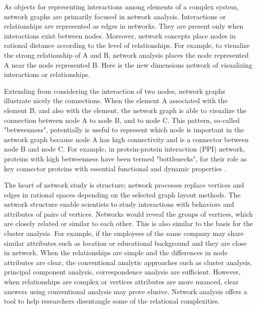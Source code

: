 As objects for representing interactions among elements of a complex system, network graphs are primarily focused in network analysis. Interactions or relationships are represented as edges in networks. They are present only when interactions exist between nodes. Moreover, network concepts place nodes in rational distance according to the level of relationships. For example, to visualize the strong relationship of A and B, network analysis places the node represented A near the node represented B. Here is the new dimensions network of visualizing interactions or relationships.
 
Extending from considering the interaction of two nodes, network graphs illustrate nicely the connections. When the element A associated with the element B, and also with the element, the network graph is able to visualize the connection between node A to node B, and to node C. This pattern, so-called "betweenness", potentially is useful to represent which node is important in the network graph because node A has high connectivity and is a connector between node B and node C. For example, in protein-protein interaction (PPI) network, proteins with high betweenness have been termed "bottlenecks", for their role as key connector proteins with essential functional and dynamic properties .

The heart of network study is structure; network processes replace vertices and edges in rational spaces depending on the selected graph layout methods. The network structure enable scientists to study interactions with behaviors and attributes of pairs of vertices. Networks would reveal the groups of vertices, which are closely related or similar to each other. This is also similar to the basis for the cluster analysis. For example, if the employees of the same company may share similar attributes such as location or educational background and they are close in network. When the relationships are simple and the differences in node attributes are clear, the conventional analytic approaches such as cluster analysis, principal component analysis, correspondence analysis are sufficient. However, when relationships are complex or vertices attributes are more nuanced, clear answers using conventional analysis may prove elusive. Network analysis offers a tool to help researchers disentangle some of the relational complexities.

